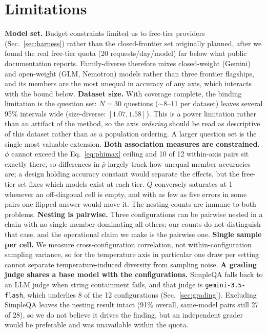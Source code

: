 \documentclass[conference]{IEEEtran}
\begin{document}
\FloatBarrier

\section{Limitations}
\label{sec:limitations}
\textbf{Model set.} Budget constraints limited us to free-tier providers
(Sec.~\ref{sec:harness}) rather than the closed-frontier set originally
planned, after we found the real free-tier quota (20 requests/day/model) far
below what public documentation reports. Family-diverse therefore mixes
closed-weight (Gemini) and open-weight (GLM, Nemotron) models rather than
three frontier flagships, and its members are the most unequal in accuracy
of any axis, which interacts with the bound below.
\textbf{Dataset size.} With coverage complete, the binding limitation is the
question set: $N=30$ questions ($\sim$8--11 per dataset) leaves several 95\%
intervals wide (size-diverse: $[1.07,1.58]$). This is a power limitation
rather than an artifact of the method, so the axis \emph{ordering} should be
read as descriptive of this dataset rather than as a population ordering. A
larger question set is the single most valuable extension.
\textbf{Both association measures are constrained.} $\phi$ cannot exceed the
Eq.~\ref{eq:phimax} ceiling and 10 of 12 within-axis pairs sit
exactly there, so differences in $\bar\rho$ largely track how unequal member
accuracies are; a design holding accuracy constant would separate the
effects, but the free-tier set fixes which models exist at each tier. $Q$
conversely saturates at 1 whenever an off-diagonal cell is empty, and with
as few as five errors in some pairs one flipped answer would move it. The
nesting counts are immune to both problems.
\textbf{Nesting is pairwise.} Three configurations can be pairwise nested in
a chain with no single member dominating all others; our counts do not
distinguish that case, and the operational claim we make is the pairwise one.
\textbf{Single sample per cell.} We measure cross-configuration correlation,
not within-configuration sampling variance, so for the temperature axis in
particular one draw per setting cannot separate temperature-induced
diversity from sampling noise.
\textbf{A grading judge shares a base model with the configurations.}
SimpleQA falls back to an LLM judge when string containment fails, and that
judge is \texttt{gemini-3.5-flash}, which underlies 8 of the 12
configurations (Sec.~\ref{sec:grading}). Excluding SimpleQA leaves the
nesting result intact (91\% overall, same-model pairs still 27 of 28), so we
do not believe it drives the finding, but an independent
grader would be preferable and was unavailable within the quota.
\end{document}
